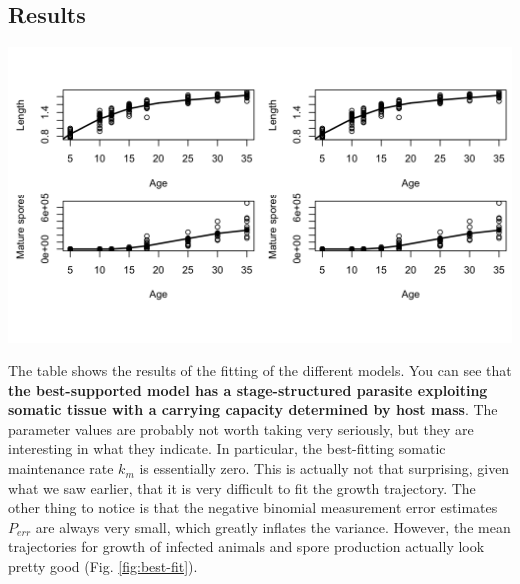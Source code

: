 \documentclass[12pt,reqno,final,pdftex]{amsart}\usepackage[]{graphicx}\usepackage[]{color}
\newenvironment{knitrout}{}{} %
\theoremstyle{plain}
\numberwithin{equation}{part}
\begin{document}
\subsection*{Results}

\begin{knitrout}\scriptsize
{}\color{fgcolor}

\includegraphics[width=\linewidth]{figure/unnamed-chunk-1-1} \hfill{}



\end{knitrout}

The table shows the results of the fitting of the different models.
You can see that \textbf{the best-supported model has a stage-structured parasite exploiting somatic tissue with a carrying capacity determined by host mass}.
The parameter values are probably not worth taking very seriously, but they are interesting in what they indicate.
In particular, the best-fitting somatic maintenance rate $k_m$ is essentially zero.
This is actually not that surprising, given what we saw earlier, that it is very difficult to fit the growth trajectory.
The other thing to notice is that the negative binomial measurement error estimates $P_{err}$ are always very small, which greatly inflates the variance.
However, the mean trajectories for growth of infected animals and spore production actually look pretty good (Fig. \ref{fig:best-fit}).
\end{document}
